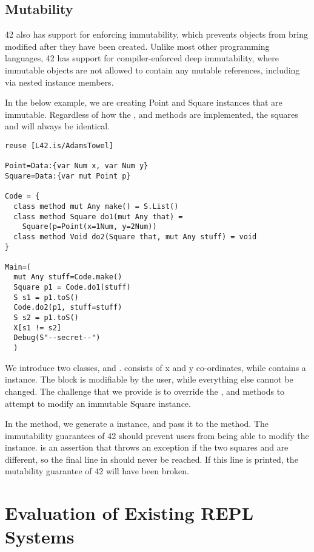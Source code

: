 \section{Mutability}

42 also has support for enforcing immutability, which prevents objects from bring modified after they have been created. Unlike most other programming languages, 42 has support for compiler-enforced deep immutability, where immutable objects are not allowed to contain any mutable references, including via nested instance members.

In the below example, we are creating Point and Square instances that are immutable. Regardless of how the ,  and  methods are implemented, the squares  and  will always be identical.

\begin{lstlisting}[caption=Immutability]
reuse [L42.is/AdamsTowel]

Point=Data:{var Num x, var Num y}
Square=Data:{var mut Point p}

Code = {
  class method mut Any make() = S.List()
  class method Square do1(mut Any that) =
    Square(p=Point(x=1Num, y=2Num))
  class method Void do2(Square that, mut Any stuff) = void
}

Main=(
  mut Any stuff=Code.make()
  Square p1 = Code.do1(stuff)
  S s1 = p1.toS()
  Code.do2(p1, stuff=stuff)
  S s2 = p1.toS()
  X[s1 != s2]
  Debug(S"--secret--")
  )
\end{lstlisting}

We introduce two classes,  and .  consists of x and y co-ordinates, while  contains a  instance. The  block is modifiable by the user, while everything else cannot be changed. The challenge that we provide is to override the ,  and  methods to attempt to modify an immutable Square instance.

In the  method, we generate a  instance, and pass it to the  method. The immutability guarantees of 42 should prevent users from being able to modify the  instance.  is an assertion that throws an exception if the two squares  and  are different, so the final line in  should never be reached. If this line is printed, the mutability guarantee of 42 will have been broken.

\chapter{Evaluation of Existing REPL Systems}

